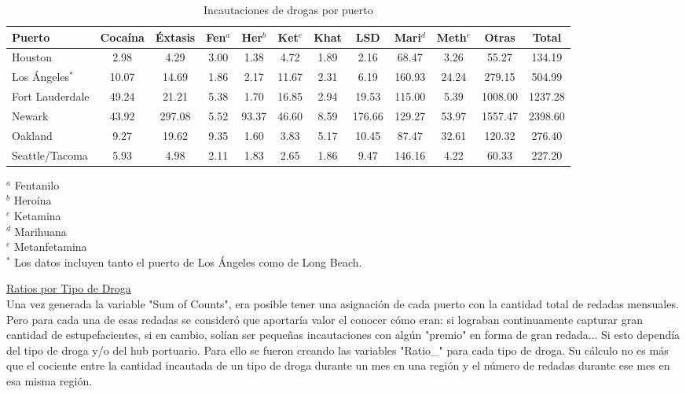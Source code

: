 \documentclass[12pt]{article}
\begin{document}
		\begingroup
		\small
		\begin{table}[H]
			\begin{center}
				\caption{Incautaciones de drogas por puerto}
				\label{tabla_incautaciones}
				\setlength{\tabcolsep}{1pt}
				\begin{tabular}{|l|c|c|c|c|c|c|c|c|c|c|c|}
					\hline
					\textbf{Puerto} & \textbf{Cocaína} & \textbf{Éxtasis} & \textbf{Fen$^a$} & \textbf{Her$^b$} & \textbf{Ket$^c$} & \textbf{Khat} & \textbf{LSD} & \textbf{Mari$^d$} & \textbf{Meth$^e$} & \textbf{Otras} & \textbf{Total} \\
					\hline
					Houston & 2.98 & 4.29 & 3.00 & 1.38 & 4.72 & 1.89 & 2.16 & 68.47 & 3.26 & 55.27 & 134.19 \\
					Los Ángeles$^*$ & 10.07 & 14.69 & 1.86 & 2.17 & 11.67 & 2.31 & 6.19 & 160.93 & 24.24 & 279.15 & 504.99 \\
					Fort Lauderdale & 49.24 & 21.21 & 5.38 & 1.70 & 16.85 & 2.94 & 19.53 & 115.00 & 5.39 & 1008.00 & 1237.28 \\
					Newark & 43.92 & 297.08 & 5.52 & 93.37 & 46.60 & 8.59 & 176.66 & 129.27 & 53.97 & 1557.47 & 2398.60 \\
					Oakland & 9.27 & 19.62 & 9.35 & 1.60 & 3.83 & 5.17 & 10.45 & 87.47 & 32.61 & 120.32 & 276.40 \\
					Seattle/Tacoma & 5.93 & 4.98 & 2.11 & 1.83 & 2.65 & 1.86 & 9.47 & 146.16 & 4.22 & 60.33 & 227.20 \\
					\hline
				\end{tabular}
			\end{center}
			$^a$ Fentanilo \\
			$^b$ Heroína \\
			$^c$ Ketamina \\ 
			$^d$ Marihuana \\
			$^e$ Metanfetamina \\
			$^*$ Los datos incluyen tanto el puerto de Los Ángeles como de Long Beach.
		\end{table}
		\endgroup
		
		\underline{Ratios por Tipo de Droga}\\
		Una vez generada la variable "Sum of Counts", era posible tener una asignación de cada puerto con la cantidad total de redadas mensuales. Pero para cada una de esas redadas se consideró que aportaría valor el conocer cómo eran: si lograban continuamente capturar gran cantidad de estupefacientes, si en cambio, solían ser pequeñas incautaciones con algún "premio" en forma de gran redada... Si esto dependía del tipo de droga y/o del hub portuario. Para ello se fueron creando las variables "Ratio\_" para cada tipo de droga. Su cálculo no es más que el cociente entre la cantidad incautada de un tipo de droga durante un mes en una región y el número de redadas durante ese mes en esa misma región.
		
\end{document}
